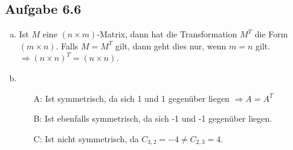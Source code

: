 \documentclass{standalone}
\begin{document}
\subsection{Aufgabe 6.6}
\begin{enumerate}[a)]
	\item
		Ist $M$ eine $(n \times m)$-Matrix, dann hat die Transformation $M^T$ die Form 
		$(m \times n)$. Falls $M = M^T$ gilt, dann geht dies nur, wenn $m = n$ gilt. $\Rightarrow (n \times n)^T = (n \times n)$. 
	\item
		\begin{itemize}
			\item[A:] Ist symmetrisch, da sich 1 und 1 gegenüber liegen $\Rightarrow A = A^T$ \checkmark
			\item[B:] Ist ebenfalls symmetrisch, da sich -1 und -1 gegenüber liegen. \checkmark
			\item[C:] Ist nicht symmetrisch, da $C_{3, 2} = -4 \neq C_{2,3} = 4$.  
		\end{itemize}
\end{enumerate}
\end{document}
